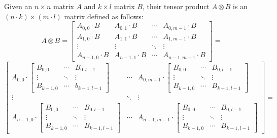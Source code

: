 \documentclass{article}
\begin{document}
Given an $n \times n$ matrix $A$ and $k \times l$ matrix $B$, their tensor product $A \otimes B$ is an $(n \cdot k) \times (m \cdot l)$ matrix defined as follows:
\begin{equation*}
    A \otimes B =
\begin{bmatrix}
    A_{0,0} \cdot B & A_{0,1} \cdot B & \dotsb & A_{0,m-1} \cdot B \\
    A_{1,0} \cdot B & A_{1,1} \cdot B & \dotsb & A_{1,m-1} \cdot B \\
    \vdots & \vdots & \ddots & \vdots \\
    A_{n-1,0} \cdot B & A_{n-1,1} \cdot B & \dotsb & A_{n-1,m-1} \cdot B
\end{bmatrix} = 
\end{equation*}
\begin{equation*}
    \begin{bmatrix}
    A_{0,0} \cdot \begin{bmatrix}B_{0,0} & \dotsb & B_{0,l-1} \\ \vdots & \ddots & \vdots \\ B_{k-1,0} & \dotsb & b_{k-1,l-1} \end{bmatrix} & \dotsb &
    A_{0,m-1} \cdot \begin{bmatrix}B_{0,0} & \dotsb & B_{0,l-1} \\ \vdots & \ddots & \vdots \\ B_{k-1,0} & \dotsb & B_{k-1,l-1} \end{bmatrix} \\
    \vdots & \ddots & \vdots \\
    A_{n-1,0} \cdot \begin{bmatrix}B_{0,0} & \dotsb & B_{0,l-1} \\ \vdots & \ddots & \vdots \\ B_{k-1,0} & \dotsb & B_{k-1,l-1} \end{bmatrix} & \dotsb &
    A_{n-1,m-1} \cdot \begin{bmatrix}B_{0,0} & \dotsb & B_{0,l-1} \\ \vdots & \ddots & \vdots \\ B_{k-1,0} & \dotsb & B_{k-1,l-1} \end{bmatrix}
\end{bmatrix} =
\end{equation*}
\end{document}
